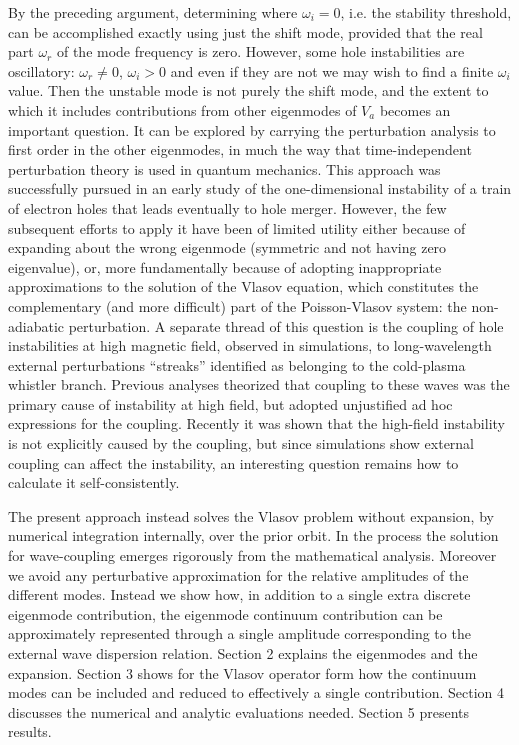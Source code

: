 \documentclass[12pt]{article}
\begin{document}
By the preceding argument, determining where $\omega_i=0$, i.e. the
stability threshold, can be accomplished exactly using just the shift
mode, provided that the real part $\omega_r$ of the mode frequency is
zero. However, some hole instabilities are oscillatory:
$\omega_r\not=0$, $\omega_i>0$ and even if they are not we may wish to
find a finite $\omega_i$ value. Then the unstable mode is not purely the
shift mode, and the extent to which it includes contributions from
other eigenmodes of $V_a$ becomes an important question. It can be
explored by carrying the perturbation analysis to first order in the
other eigenmodes, in much the way that time-independent perturbation
theory is used in quantum mechanics. This approach was successfully
pursued in an early study of the one-dimensional instability of a
train of electron holes that leads eventually to hole
merger\cite{Schwarzmeier1979}. However, the few subsequent efforts to
apply it\cite{Schamel1982,Schamel1987} have been of limited utility
either because of expanding about the wrong eigenmode (symmetric and
not having zero eigenvalue), or, more fundamentally because of
adopting inappropriate approximations to the solution of the Vlasov
equation\cite{Jovanovic2002}, which constitutes the complementary (and
more difficult) part of the Poisson-Vlasov system: the non-adiabatic
perturbation. A separate thread of this question is the coupling of
hole instabilities at high magnetic field, observed in
simulations\cite{Oppenheim1999,Oppenheim2001b,Lu2008}, to
long-wavelength external perturbations ``streaks'' identified as
belonging to the cold-plasma whistler branch. Previous
analyses\cite{Newman2001a,Vetoulis2001,Berthomier2002} theorized that
coupling to these waves was the primary cause of instability at high
field, but adopted unjustified ad hoc expressions for the
coupling. Recently it was shown that the high-field instability is not
explicitly caused by the coupling\cite{Hutchinson2019a}, but since
simulations show external coupling can affect the instability, an
interesting question remains how to calculate it self-consistently.


The present approach instead solves the Vlasov problem without
expansion, by numerical integration internally, over the prior orbit.
In the process the solution for wave-coupling emerges rigorously from
the mathematical analysis. Moreover we avoid any perturbative
approximation for the relative amplitudes of the different modes.
Instead we show how, in addition to a single extra discrete eigenmode
contribution, the eigenmode continuum contribution can be
approximately represented through a single amplitude corresponding to
the external wave dispersion relation.  Section 2 explains the
eigenmodes and the expansion. Section 3 shows for the Vlasov operator
form how the continuum modes can be included and reduced to
effectively a single contribution. Section 4 discusses the numerical
and analytic evaluations needed. Section 5 presents results.
\end{document}
